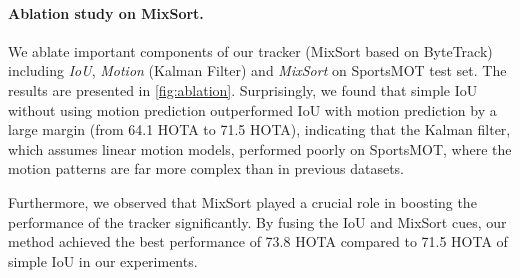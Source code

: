 \documentclass[10pt,twocolumn,letterpaper]{article}
\begin{document}
\vspace{-4mm}
\paragraph{Ablation study on MixSort.}
We ablate important components of our tracker (MixSort based on ByteTrack) including \textit{IoU}, \textit{Motion} (Kalman Filter) and \textit{MixSort} on SportsMOT test set. The results are presented in \cref{fig:ablation}.
Surprisingly, we found that simple IoU without using motion prediction outperformed IoU with motion prediction by a large margin (from 64.1 HOTA to 71.5 HOTA), indicating that the Kalman filter, which assumes linear motion models, performed poorly on SportsMOT, where the motion patterns are far more complex than in previous datasets.

Furthermore, we observed that MixSort played a crucial role in boosting the performance of the tracker significantly. By fusing the IoU and MixSort cues, our method achieved the best performance of 73.8 HOTA compared to 71.5 HOTA of simple IoU in our experiments.

\vspace{-4mm}
\end{document}

